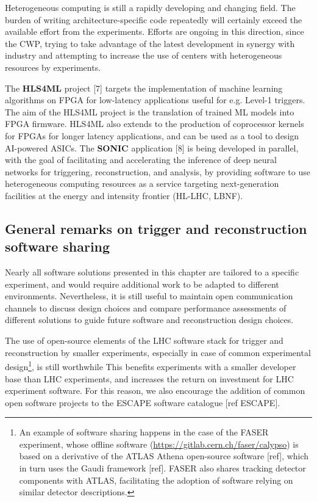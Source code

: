 \documentclass[10pt,a4paper]{article}
\begin{document}
Heterogeneous computing is still a rapidly developing and changing
field. The burden of writing architecture-specific code repeatedly will
certainly exceed the available effort from the experiments. Efforts are
ongoing in this direction, since the CWP, trying to take advantage of
the latest development in synergy with industry and attempting to
increase the use of centers with heterogeneous resources by experiments.

The \textbf{HLS4ML} project {[}7{]} targets the implementation of
machine learning algorithms on FPGA for low-latency applications useful
for e.g. Level-1 triggers. The aim of the HLS4ML project is the
translation of trained ML models into FPGA firmware. HLS4ML also extends
to the production of coprocessor kernels for FPGAs for longer latency
applications, and can be used as a tool to design AI-powered ASICs. The
\textbf{SONIC} application {[}8{]} is being developed in parallel, with
the goal of facilitating and accelerating the inference of deep neural
networks for triggering, reconstruction, and analysis, by providing
software to use heterogeneous computing resources as a service targeting
next-generation facilities at the energy and intensity frontier (HL-LHC,
LBNF).

\hypertarget{general-remarks-on-trigger-and-reconstruction-software-sharing}{%
\subsection{General remarks on trigger and reconstruction software
sharing}\label{general-remarks-on-trigger-and-reconstruction-software-sharing}}

Nearly all software solutions presented in this chapter are tailored to
a specific experiment, and would require additional work to be adapted
to different environments. Nevertheless, it is still useful to maintain
open communication channels to discuss design choices and compare
performance assessments of different solutions to guide future software
and reconstruction design choices.

The use of open-source elements of the LHC software stack for trigger
and reconstruction by smaller experiments, especially in case of common
experimental design\footnote{An example of software sharing happens in
  the case of the FASER experiment, whose offline software
  (\href{https://gitlab.cern.ch/faser/calypso}{{https://gitlab.cern.ch/faser/calypso}})
  is based on a derivative of the ATLAS Athena open-source software
  {[}ref{]}, which in turn uses the Gaudi framework {[}ref{]}. FASER
  also shares tracking detector components with ATLAS, facilitating the
  adoption of software relying on similar detector descriptions.}, is
still worthwhile This benefits experiments with a smaller developer base
than LHC experiments, and increases the return on investment for LHC
experiment software. For this reason, we also encourage the addition of
common open software projects to the ESCAPE software catalogue {[}ref
ESCAPE{]}.
\end{document}
